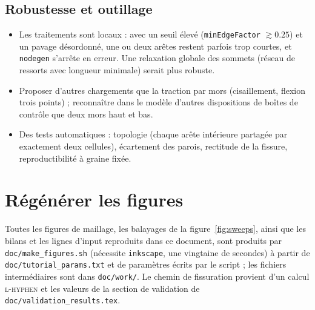 \documentclass[11pt,a4paper]{article}
\newcommand{\code}[1]{\texttt{#1}}
\newcommand{\toolgen}{\code{nodegen}}
\begin{document}
\subsection{Robustesse et outillage}

\begin{itemize}[nosep]
  \item Les traitements sont locaux : avec un seuil élevé (\code{minEdgeFactor} $\gtrsim0.25$) et un pavage
    désordonné, une ou deux arêtes restent parfois trop courtes, et \toolgen{} s'arrête en erreur. Une relaxation globale des sommets (réseau de ressorts avec longueur minimale) serait plus
    robuste.
  \item Proposer d'autres chargements que la traction par mors (cisaillement, flexion trois points) ; reconnaître
    dans le modèle d'autres dispositions de boîtes de contrôle que deux mors haut et bas.
  \item Des tests automatiques : topologie (chaque arête intérieure partagée par exactement deux cellules),
    écartement des parois, rectitude de la fissure, reproductibilité à graine fixée.
\end{itemize}

\section*{Régénérer les figures}

Toutes les figures de maillage, les balayages de la figure~\ref{fig:sweeps}, ainsi que les bilans et les lignes
d'input reproduits dans ce document, sont produits par \code{doc/make\_figures.sh} (nécessite \code{inkscape}, une
vingtaine de secondes) à partir de \code{doc/tutorial\_params.txt} et de paramètres écrits par le script ; les
fichiers intermédiaires sont dans \code{doc/work/}. Le chemin de fissuration provient d'un calcul \textsc{l-hyphen}
et les valeurs de la section de validation de \code{doc/validation\_results.tex}.
\end{document}
